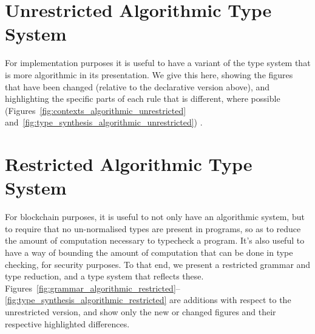 \documentclass[a4paper]{article}
\begin{document}
\begin{appendices}
\section{Unrestricted Algorithmic Type System}

For implementation purposes it is useful to have a variant of the type
system that is more algorithmic in its presentation. We give this
here, showing the figures that have been changed (relative to the
declarative version above), and highlighting the specific parts of
each rule that is different, where possible (Figures~\ref{fig:contexts_algorithmic_unrestricted}
and~\ref{fig:type_synthesis_algorithmic_unrestricted}) .



\newpage

\section{Restricted Algorithmic Type System}

For blockchain purposes, it is useful to not only have an algorithmic
system, but to require that no un-normalised types are present in
programs, so as to reduce the amount of computation necessary to
typecheck a program. It's also useful to have a way of bounding the
amount of computation that can be done in type checking, for security
purposes. To that end, we present a restricted grammar and type
reduction, and a type system that reflects these.
Figures~\ref{fig:grammar_algorithmic_restricted}--\ref{fig:type_synthesis_algorithmic_restricted}
are additions with respect to the unrestricted version, and show only
the new or changed figures and their respective highlighted
differences.







\end{appendices}


\end{document}
